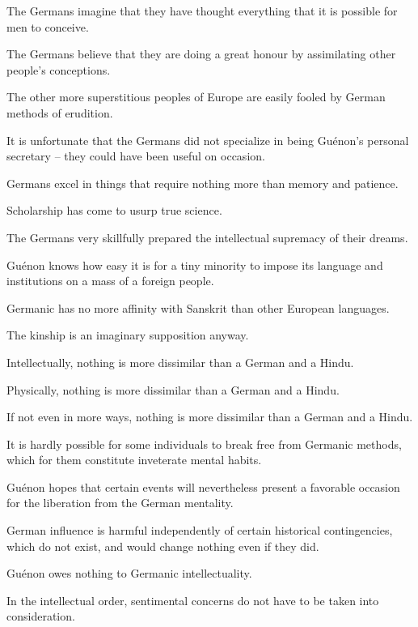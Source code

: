 \begin{footnotesize}
\begin{sffamily}
The Germans imagine that they have thought everything that it is possible for men to conceive.

The Germans believe that they are doing a great honour by assimilating other people's conceptions.

The other more superstitious peoples of Europe are easily fooled by German methods of erudition.

It is unfortunate that the Germans did not specialize in being Guénon's personal secretary – they could have been useful on occasion.

Germans excel in things that require nothing more than memory and patience.

Scholarship has come to usurp true science.

The Germans very skillfully prepared the intellectual supremacy of their dreams.

Guénon knows how easy it is for a tiny minority to impose its language and institutions on a mass of a foreign people.

Germanic has no more affinity with Sanskrit than other European languages.

The kinship is an imaginary supposition anyway.

Intellectually, nothing is more dissimilar than a German and a Hindu.

Physically, nothing is more dissimilar than a German and a Hindu.

If not even in more ways, nothing is more dissimilar than a German and a Hindu.

It is hardly possible for some individuals to break free from Germanic methods, which for them constitute inveterate mental habits.

Guénon hopes that certain events will nevertheless present a favorable occasion for the liberation from the German mentality.

German influence is harmful independently of certain historical contingencies, which do not exist, and would change nothing even if they did.

Guénon owes nothing to Germanic intellectuality.

In the intellectual order, sentimental concerns do not have to be taken into consideration.


\end{sffamily}\end{footnotesize}
